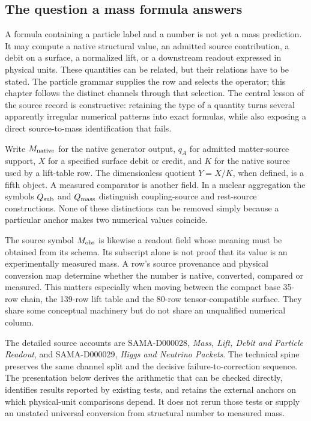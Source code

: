 \label{v2c3:chapter}
\begingroup
\setlength{\parskip}{0.04em}

\subsection{The question a mass formula answers}

A formula containing a particle label and a number is not yet a mass prediction. It may compute a native structural value, an admitted source contribution, a debit on a surface, a normalized lift, or a downstream readout expressed in physical units. These quantities can be related, but their relations have to be stated. The particle grammar supplies the row and selects the operator; this chapter follows the distinct channels through that selection. The central lesson of the source record is constructive: retaining the type of a quantity turns several apparently irregular numerical patterns into exact formulas, while also exposing a direct source-to-mass identification that fails.

Write $M_{\rm native}$ for the native generator output, $q_A$ for admitted matter-source support, $X$ for a specified surface debit or credit, and $K$ for the native source used by a lift-table row. The dimensionless quotient $Y=X/K$, when defined, is a fifth object. A measured comparator is another field. In a nuclear aggregation the symbols $Q_{\rm sub}$ and $Q_{\rm mass}$ distinguish coupling-source and rest-source constructions. None of these distinctions can be removed simply because a particular anchor makes two numerical values coincide.

The source symbol $M_{\rm obs}$ is likewise a readout field whose meaning must be obtained from its schema. Its subscript alone is not proof that its value is an experimentally measured mass. A row's source provenance and physical conversion map determine whether the number is native, converted, compared or measured. This matters especially when moving between the compact base 35-row chain, the 139-row lift table and the 80-row tensor-compatible surface. They share some conceptual machinery but do not share an unqualified numerical column.

The detailed source accounts are SAMA-D000028, \emph{Mass, Lift, Debit and Particle Readout}, and SAMA-D000029, \emph{Higgs and Neutrino Packets}. The technical spine preserves the same channel split and the decisive failure-to-correction sequence.\cite{viisama,viispine,viireview} The presentation below derives the arithmetic that can be checked directly, identifies results reported by existing tests, and retains the external anchors on which physical-unit comparisons depend. It does not rerun those tests or supply an unstated universal conversion from structural number to measured mass.


